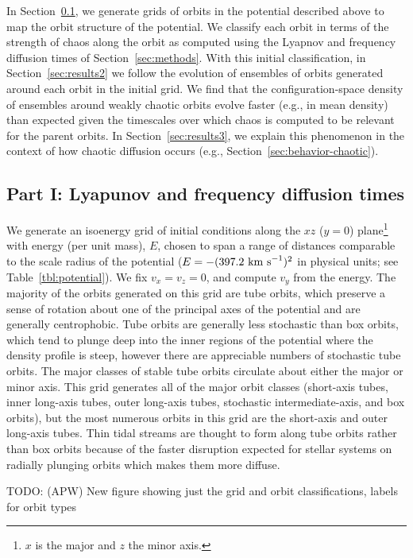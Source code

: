 \documentclass[letterpaper,12pt,preprint]{aastex}
\newcommand{\todo}[2]{{\color{red} TODO: (\MakeUppercase{#1}) #2}}
\begin{document}
In Section~\ref{sec:results1}, we generate grids of orbits in the potential described above to map the orbit structure of the potential. We classify each orbit in terms of the strength of chaos along the orbit as computed using the Lyapnov and frequency diffusion times of Section~\ref{sec:methods}. With this initial classification, in Section~\ref{sec:results2} we follow the evolution of ensembles of orbits generated around each orbit in the initial grid. We find that the configuration-space density of ensembles around weakly chaotic orbits evolve faster (e.g., in mean density) than expected given the timescales over which chaos is computed to be relevant for the parent orbits. In Section~\ref{sec:results3}, we explain this phenomenon in the context of how chaotic diffusion occurs (e.g., Section~\ref{sec:behavior-chaotic}).

\subsection{Part I: Lyapunov and frequency diffusion times}\label{sec:results1}

We generate an isoenergy grid of initial conditions along the $xz$ ($y=0$) plane\footnote{$x$ is the major and $z$ the minor axis.} with energy (per unit mass), $E$, chosen to span a range of distances comparable to the scale radius of the potential ($E=-(397.2~{\rm km~s}^{-1})^2$ in physical units; see Table~\ref{tbl:potential}). We fix $v_x = v_z = 0$, and compute $v_y$ from the energy. The majority of the orbits generated on this grid are tube orbits, which preserve a sense of rotation about one of the principal axes of the potential and are generally centrophobic. Tube orbits are generally less stochastic than box orbits, which tend to plunge deep into the inner regions of the potential where the density profile is steep, however there are appreciable numbers of stochastic tube orbits. The major classes of stable tube orbits circulate about either the major or minor axis. This grid generates all of the major orbit classes (short-axis tubes, inner long-axis tubes, outer long-axis tubes, stochastic intermediate-axis, and box orbits), but the most numerous orbits in this grid are the short-axis and outer long-axis tubes. Thin tidal streams are thought to form along tube orbits rather than box orbits because of the faster disruption expected for stellar systems on radially plunging orbits which makes them more diffuse.

\todo{apw}{New figure showing just the grid and orbit classifications, labels for orbit types}
\end{document}
